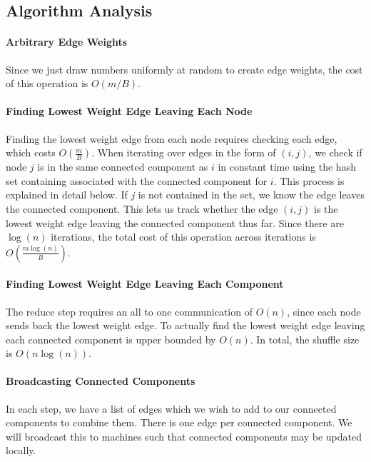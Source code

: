 \documentclass[12pt]{article}
\begin{document}
\subsection*{Algorithm Analysis}

\paragraph{Arbitrary Edge Weights}
Since we just draw numbers uniformly at random to create edge weights, the cost of this operation is $O(m/B)$.

\paragraph{Finding Lowest Weight Edge Leaving Each Node}

Finding the lowest weight edge from each node requires checking each edge, which costs $O(\frac{m}{B})$. When iterating over edges in the form of $(i,j)$, we check if node $j$ is in the same connected component as $i$ in constant time using the hash set containing associated with the connected component for $i$. This process is explained in detail below. If $j$ is not contained in the set, we know the edge leaves the connected component. This lets us track whether the edge $(i,j)$ is the lowest weight edge leaving the connected component thus far. Since there are $\log(n)$ iterations, the total cost of this operation across iterations is $O(\frac{m \log(n)}{B})$.

\paragraph{Finding Lowest Weight Edge Leaving Each Component}

The reduce step requires an all to one communication of $O(n)$, since each node sends back the lowest weight edge. To actually find the lowest weight edge leaving each connected component is upper bounded by $O(n)$.  In total, the shuffle size is $O(n \log(n))$.

\paragraph{Broadcasting Connected Components}
In each step, we have a list of edges which we wish to add to our connected components to combine them. There is one edge per connected component. We will broadcast this to machines such that connected components may be updated locally.
\end{document}

